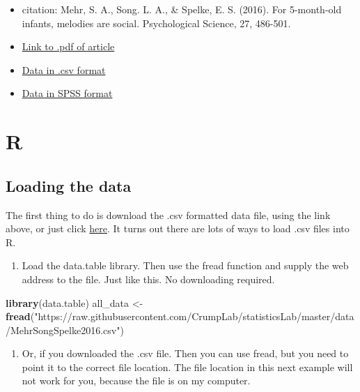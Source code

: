 \documentclass[]{book}
\newenvironment{Shaded}{\begin{snugshade}}{\end{snugshade}}
\newcommand{\KeywordTok}[1]{\textcolor[rgb]{0.13,0.29,0.53}{\textbf{{#1}}}}
\newcommand{\StringTok}[1]{\textcolor[rgb]{0.31,0.60,0.02}{{#1}}}
\newcommand{\NormalTok}[1]{{#1}}
\providecommand{\tightlist}{%
  \setlength{\itemsep}{0pt}\setlength{\parskip}{0pt}}
\theoremstyle{definition}
\theoremstyle{definition}
\theoremstyle{definition}
\theoremstyle{remark}
\begin{document}
\begin{itemize}
\tightlist
\item
  citation: Mehr, S. A., Song. L. A., \& Spelke, E. S. (2016). For
  5-month-old infants, melodies are social. Psychological Science, 27,
  486-501.
\item
  \href{http://journals.sagepub.com/stoken/default+domain/d5HcBHg85XamSXGdYqYN/full}{Link
  to .pdf of article}
\item
  \href{https://drive.google.com/open?id=0Bz-rhZ21ShvOdW1wV0pmUTJSSk0}{Data
  in .csv format}
\item
  \href{https://drive.google.com/open?id=0Bz-rhZ21ShvOa3c4X3hqOWxwcUU}{Data
  in SPSS format}
\end{itemize}

\section{R}\label{r-6}

\subsection{Loading the data}\label{loading-the-data}

The first thing to do is download the .csv formatted data file, using
the link above, or just click
\href{https://drive.google.com/open?id=0Bz-rhZ21ShvOdW1wV0pmUTJSSk0}{here}.
It turns out there are lots of ways to load .csv files into R.

\begin{enumerate}
\def\labelenumi{\arabic{enumi}.}
\tightlist
\item
  Load the data.table library. Then use the fread function and supply
  the web address to the file. Just like this. No downloading required.
\end{enumerate}

\begin{Shaded}
\begin{Highlighting}[]
\KeywordTok{library}\NormalTok{(data.table)}
\NormalTok{all_data <-}\StringTok{ }\KeywordTok{fread}\NormalTok{(}\StringTok{"https://raw.githubusercontent.com/CrumpLab/statisticsLab/master/data/MehrSongSpelke2016.csv"}\NormalTok{)}
\end{Highlighting}
\end{Shaded}

\begin{enumerate}
\def\labelenumi{\arabic{enumi}.}
\setcounter{enumi}{1}
\tightlist
\item
  Or, if you downloaded the .csv file. Then you can use fread, but you
  need to point it to the correct file location. The file location in
  this next example will not work for you, because the file is on my
  computer.
\end{enumerate}
\end{document}
